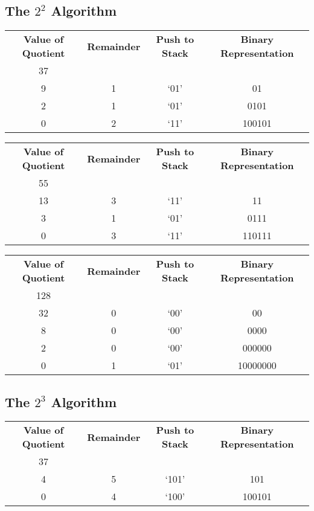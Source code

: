 \documentclass[12pt]{article}
\begin{document}
\subsection{The $2^2$ Algorithm}
\begin{center}
  \begin{tabular}{c|c|c|c}
    \textbf{Value of Quotient} & \textbf{Remainder} & \textbf{Push to Stack} & \textbf{Binary Representation} \\
    37 &   &      & \\
    9  & 1 & `01' & 01 \\
    2  & 1 & `01' & 0101 \\
    0  & 2 & `11' & 100101
  \end{tabular}
\end{center}

\begin{center}
  \begin{tabular}{c|c|c|c}
    \textbf{Value of Quotient} & \textbf{Remainder} & \textbf{Push to Stack} & \textbf{Binary Representation} \\
    55 &   &      & \\
    13 & 3 & `11' & 11 \\
    3  & 1 & `01' & 0111 \\
    0  & 3 & `11' & 110111
  \end{tabular}
\end{center}

\begin{center}
  \begin{tabular}{c|c|c|c}
    \textbf{Value of Quotient} & \textbf{Remainder} & \textbf{Push to Stack} & \textbf{Binary Representation} \\
    128 &   &      & \\
    32  & 0 & `00' & 00 \\
    8   & 0 & `00' & 0000 \\
    2   & 0 & `00' & 000000 \\
    0   & 1 & `01' & 10000000
  \end{tabular}
\end{center}

\subsection{The $2^3$ Algorithm}
\begin{center}
  \begin{tabular}{c|c|c|c}
    \textbf{Value of Quotient} & \textbf{Remainder} & \textbf{Push to Stack} & \textbf{Binary Representation} \\
    37 &   &       & \\
    4  & 5 & `101' & 101 \\
    0  & 4 & `100' & 100101
  \end{tabular}
\end{center}
\end{document}
